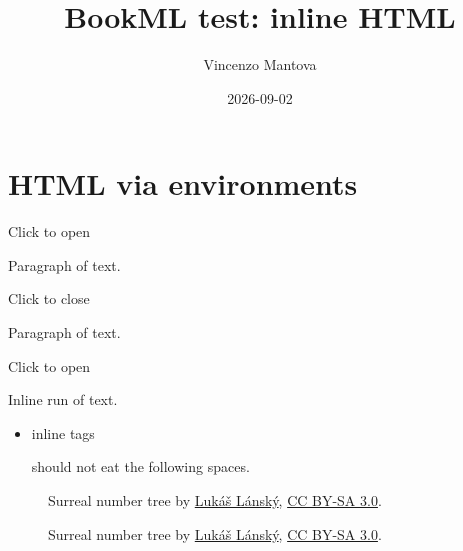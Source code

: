 \documentclass{article}
\title{BookML test: inline HTML}
\author{Vincenzo Mantova}
\date{2026-09-02}
\begin{document}
\section{HTML via environments}
\begin{h:details}
  \begin{h:summary}Click to open\end{h:summary}
  Paragraph of text.
\end{h:details}

\begin{h:details}[open]
  \begin{h:summary}Click to close\end{h:summary}
  Paragraph of text.
\end{h:details}

\begin{h:details}
  \begin{h:summary}Click to open\end{h:summary}
  \begin{h:span}Inline run of text.\end{h:span}
\end{h:details}

\begin{itemize}
  \item \begin{h:b}inline tags\end{h:b} should not eat the following spaces.
\end{itemize}

\begin{figure}
  \centering
  \begin{h:a}[href={https://en.wikipedia.org/wiki/Surreal_number#/media/File:Surreal_number_tree.svg}]\begin{h:img}[src={https://upload.wikimedia.org/wikipedia/commons/4/49/Surreal_number_tree.svg},width=256,height=323]\end{h:img}\end{h:a}
  \caption{Surreal number tree by \href{https://commons.wikimedia.org/wiki/User:Luk\%C3\%A1\%C5\%A1_L\%C3\%A1nsk\%C3\%BD}{Lukáš Lánský}, \href{https://creativecommons.org/licenses/by-sa/3.0}{CC BY-SA 3.0}.}
\end{figure}

\begin{figure}
  \centering
  \begin{h:a}[href={https://en.wikipedia.org/wiki/Surreal\_number\#/media/File:Surreal\_number\_tree.svg}]\begin{h:img}[src={https://upload.wikimedia.org/wikipedia/commons/4/49/Surreal\_number\_tree.svg},width=256,height=323]\end{h:img}\end{h:a}
  \caption{Surreal number tree by \href{https://commons.wikimedia.org/wiki/User:Luk\%C3\%A1\%C5\%A1_L\%C3\%A1nsk\%C3\%BD}{Lukáš Lánský}, \href{https://creativecommons.org/licenses/by-sa/3.0}{CC BY-SA 3.0}.}
\end{figure}
\end{document}

